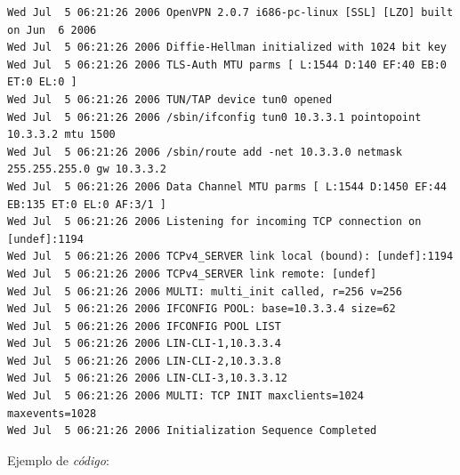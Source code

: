 \begin{Verbatim}[fontsize=\scriptsize]
Wed Jul  5 06:21:26 2006 OpenVPN 2.0.7 i686-pc-linux [SSL] [LZO] built on Jun  6 2006
Wed Jul  5 06:21:26 2006 Diffie-Hellman initialized with 1024 bit key
Wed Jul  5 06:21:26 2006 TLS-Auth MTU parms [ L:1544 D:140 EF:40 EB:0 ET:0 EL:0 ]
Wed Jul  5 06:21:26 2006 TUN/TAP device tun0 opened
Wed Jul  5 06:21:26 2006 /sbin/ifconfig tun0 10.3.3.1 pointopoint 10.3.3.2 mtu 1500
Wed Jul  5 06:21:26 2006 /sbin/route add -net 10.3.3.0 netmask 255.255.255.0 gw 10.3.3.2
Wed Jul  5 06:21:26 2006 Data Channel MTU parms [ L:1544 D:1450 EF:44 EB:135 ET:0 EL:0 AF:3/1 ]
Wed Jul  5 06:21:26 2006 Listening for incoming TCP connection on [undef]:1194
Wed Jul  5 06:21:26 2006 TCPv4_SERVER link local (bound): [undef]:1194
Wed Jul  5 06:21:26 2006 TCPv4_SERVER link remote: [undef]
Wed Jul  5 06:21:26 2006 MULTI: multi_init called, r=256 v=256
Wed Jul  5 06:21:26 2006 IFCONFIG POOL: base=10.3.3.4 size=62
Wed Jul  5 06:21:26 2006 IFCONFIG POOL LIST
Wed Jul  5 06:21:26 2006 LIN-CLI-1,10.3.3.4
Wed Jul  5 06:21:26 2006 LIN-CLI-2,10.3.3.8
Wed Jul  5 06:21:26 2006 LIN-CLI-3,10.3.3.12
Wed Jul  5 06:21:26 2006 MULTI: TCP INIT maxclients=1024 maxevents=1028
Wed Jul  5 06:21:26 2006 Initialization Sequence Completed
\end{Verbatim}

Ejemplo de \emph{código}:

